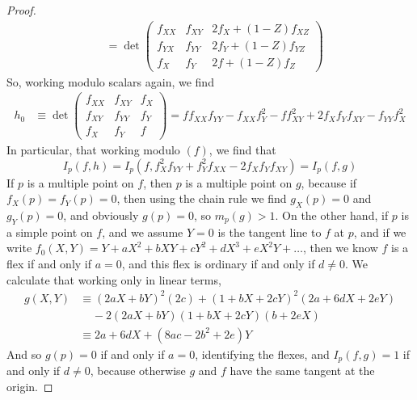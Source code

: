 \begin{proof}
\begin{align*}
        &= \det \begin{pmatrix} f_{XX} & f_{XY} & 2f_X + (1-Z)f_{XZ} \\ f_{YX} & f_{YY} & 2f_Y + (1-Z)f_{YZ} \\ f_X & f_Y & 2f + (1-Z)f_Z \end{pmatrix}
    \end{align*}
    So, working modulo scalars again, we find
    \begin{align*}
        h_0 &\equiv \det \begin{pmatrix} f_{XX} & f_{XY} & f_X \\ f_{XY} & f_{YY} & f_Y \\ f_X & f_Y & f \end{pmatrix} = f f_{XX}f_{YY} - f_{XX}f_Y^2 - f f_{XY}^2 + 2 f_Xf_Y f_{XY} - f_{YY}f_X^2
    \end{align*}
    In particular, that working modulo $(f)$, we find that
    \[ I_p(f,h) = I_p(f,f_X^2 f_{YY} + f_Y^2 f_{XX} - 2 f_X f_Y f_{XY}) = I_p(f,g) \]
    If $p$ is a multiple point on $f$, then $p$ is a multiple point on $g$, because if $f_X(p) = f_Y(p) = 0$, then using the chain rule we find $g_X(p) = 0$ and $g_Y(p) = 0$, and obviously $g(p) = 0$, so $m_p(g) > 1$. On the other hand, if $p$ is a simple point on $f$, and we assume $Y = 0$ is the tangent line to $f$ at $p$, and if we write $f_0(X,Y) = Y + aX^2 + bXY + cY^2 + dX^3 + eX^2Y + \dots$, then we know $f$ is a flex if and only if $a = 0$, and this flex is ordinary if and only if $d \neq 0$. We calculate that working only in linear terms,
    \begin{align*}
        g(X,Y) &\equiv (2aX + bY)^2 (2c) + (1 + bX + 2cY)^2(2a + 6dX + 2eY)\\
        &\ \ \ \ \ - 2(2aX + bY)(1 + bX + 2cY)(b + 2eX)\\
        &\equiv 2a + 6dX + (8ac - 2b^2 + 2e)Y
    \end{align*}
    And so $g(p) = 0$ if and only if $a = 0$, identifying the flexes, and $I_p(f,g) = 1$ if and only if $d \neq 0$, because otherwise $g$ and $f$ have the same tangent at the origin.
\end{proof}

